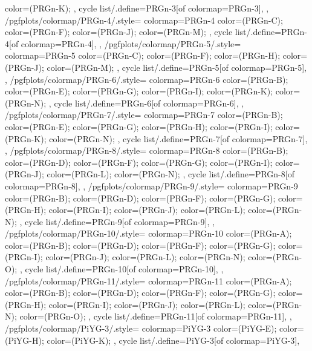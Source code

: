 {{{      color=(PRGn-K);
    },
    cycle list/.define={PRGn-3}{[of colormap=PRGn-3]},
  },
  /pgfplots/colormap/PRGn-4/.style={
    colormap={PRGn-4}{
      color=(PRGn-C);
      color=(PRGn-F);
      color=(PRGn-J);
      color=(PRGn-M);
    },
    cycle list/.define={PRGn-4}{[of colormap=PRGn-4]},
  },
  /pgfplots/colormap/PRGn-5/.style={
    colormap={PRGn-5}{
      color=(PRGn-C);
      color=(PRGn-F);
      color=(PRGn-H);
      color=(PRGn-J);
      color=(PRGn-M);
    },
    cycle list/.define={PRGn-5}{[of colormap=PRGn-5]},
  },
  /pgfplots/colormap/PRGn-6/.style={
    colormap={PRGn-6}{
      color=(PRGn-B);
      color=(PRGn-E);
      color=(PRGn-G);
      color=(PRGn-I);
      color=(PRGn-K);
      color=(PRGn-N);
    },
    cycle list/.define={PRGn-6}{[of colormap=PRGn-6]},
  },
  /pgfplots/colormap/PRGn-7/.style={
    colormap={PRGn-7}{
      color=(PRGn-B);
      color=(PRGn-E);
      color=(PRGn-G);
      color=(PRGn-H);
      color=(PRGn-I);
      color=(PRGn-K);
      color=(PRGn-N);
    },
    cycle list/.define={PRGn-7}{[of colormap=PRGn-7]},
  },
  /pgfplots/colormap/PRGn-8/.style={
    colormap={PRGn-8}{
      color=(PRGn-B);
      color=(PRGn-D);
      color=(PRGn-F);
      color=(PRGn-G);
      color=(PRGn-I);
      color=(PRGn-J);
      color=(PRGn-L);
      color=(PRGn-N);
    },
    cycle list/.define={PRGn-8}{[of colormap=PRGn-8]},
  },
  /pgfplots/colormap/PRGn-9/.style={
    colormap={PRGn-9}{
      color=(PRGn-B);
      color=(PRGn-D);
      color=(PRGn-F);
      color=(PRGn-G);
      color=(PRGn-H);
      color=(PRGn-I);
      color=(PRGn-J);
      color=(PRGn-L);
      color=(PRGn-N);
    },
    cycle list/.define={PRGn-9}{[of colormap=PRGn-9]},
  },
  /pgfplots/colormap/PRGn-10/.style={
    colormap={PRGn-10}{
      color=(PRGn-A);
      color=(PRGn-B);
      color=(PRGn-D);
      color=(PRGn-F);
      color=(PRGn-G);
      color=(PRGn-I);
      color=(PRGn-J);
      color=(PRGn-L);
      color=(PRGn-N);
      color=(PRGn-O);
    },
    cycle list/.define={PRGn-10}{[of colormap=PRGn-10]},
  },
  /pgfplots/colormap/PRGn-11/.style={
    colormap={PRGn-11}{
      color=(PRGn-A);
      color=(PRGn-B);
      color=(PRGn-D);
      color=(PRGn-F);
      color=(PRGn-G);
      color=(PRGn-H);
      color=(PRGn-I);
      color=(PRGn-J);
      color=(PRGn-L);
      color=(PRGn-N);
      color=(PRGn-O);
    },
    cycle list/.define={PRGn-11}{[of colormap=PRGn-11]},
  },
  /pgfplots/colormap/PiYG-3/.style={
    colormap={PiYG-3}{
      color=(PiYG-E);
      color=(PiYG-H);
      color=(PiYG-K);
    },
    cycle list/.define={PiYG-3}{[of colormap=PiYG-3]},
}}
